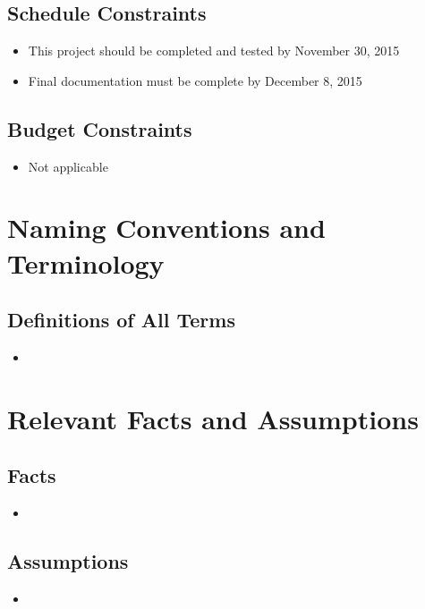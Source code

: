 \documentclass{article}
\begin{document}
\subsection{Schedule Constraints}
\begin{itemize}
	
\item
This project should be completed and tested by November 30, 2015

\item
Final documentation must be complete by December 8, 2015
	
\end{itemize}

\subsection{Budget Constraints}
\begin{itemize}
	
\item
Not applicable
	
\end{itemize}

\section{Naming Conventions and Terminology}
\subsection{Definitions of All Terms}
\begin{itemize}
	
\item

	
\end{itemize}

\section{Relevant Facts and Assumptions}


\subsection{Facts}
\begin{itemize}
	
\item
	
	
\end{itemize}

\subsection{Assumptions}
\begin{itemize}
	
\item
	
\end{itemize}
\end{document}
